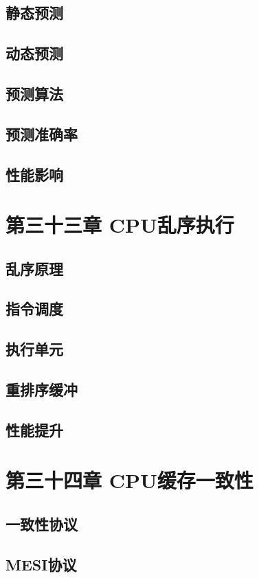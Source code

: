 \documentclass[12pt,UTF8]{ctexbook}
\begin{document}
\section{静态预测}
\section{动态预测}
\section{预测算法}
\section{预测准确率}
\section{性能影响}

\chapter{第三十三章 CPU乱序执行}

\section{乱序原理}
\section{指令调度}
\section{执行单元}
\section{重排序缓冲}
\section{性能提升}

\chapter{第三十四章 CPU缓存一致性}

\section{一致性协议}
\section{MESI协议}
\end{document}
